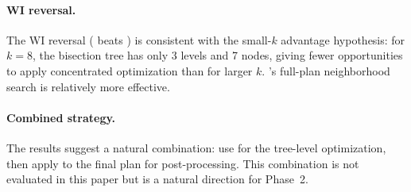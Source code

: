 \paragraph{WI reversal.}
The WI reversal (\shb{} beats \be{}) is consistent with the small-$k$
advantage hypothesis: for $k = 8$, the bisection tree has only
3 levels and 7 nodes, giving \be{} fewer opportunities to apply
concentrated optimization than for larger $k$.
\shb{}'s full-plan neighborhood search is relatively more effective.

\paragraph{Combined strategy.}
The results suggest a natural combination: use \be{} for the tree-level
optimization, then apply \shb{} to the final plan for post-processing.
This combination is not evaluated in this paper but is a natural
direction for Phase~2.

